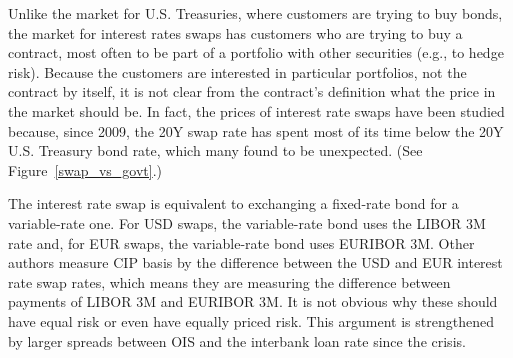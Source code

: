 Unlike the market for U.S. Treasuries, where customers are trying to buy bonds, the market for interest rates swaps has customers who are trying to buy a contract, most often to be part of a portfolio with other securities (e.g., to hedge risk).  Because the customers are interested in particular portfolios, not the contract by itself, it is not clear from the contract's definition what the price in the market should be.  In fact, the prices of interest rate swaps have been studied\cite{Jermann2017} because, since 2009, the 20Y swap rate has spent most of its time below the 20Y U.S. Treasury bond rate, which many found to be unexpected.  (See Figure~\ref{swap_vs_govt}.)


The interest rate swap is equivalent to exchanging a fixed-rate bond for a variable-rate one.  For USD swaps, the variable-rate bond uses the LIBOR 3M rate and, for EUR swaps, the variable-rate bond uses EURIBOR 3M.  Other authors measure CIP basis by the difference between the USD and EUR interest rate swap rates, which means they are measuring the difference between payments of LIBOR 3M and EURIBOR 3M.  It is not obvious why these should have equal risk or even have equally priced risk.  This argument is strengthened by larger spreads between OIS and the interbank loan rate since the crisis.\cite{Du2017,Borio2016}





